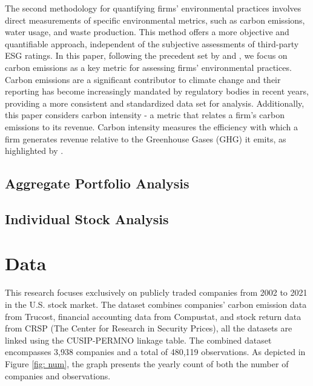 \documentclass[12pt]{article}
\begin{document}
The second methodology for quantifying firms' environmental practices involves direct measurements of specific environmental metrics, such as carbon emissions, water usage, and waste production. This method offers a more objective and quantifiable approach, independent of the subjective assessments of third-party ESG ratings. In this paper, following the precedent set by \cite{bolton2021investors} and \cite{ardia2022climate}, we focus on carbon emissions as a key metric for assessing firms' environmental practices. Carbon emissions are a significant contributor to climate change and their reporting has become increasingly mandated by regulatory bodies in recent years, providing a more consistent and standardized data set for analysis. Additionally, this paper considers carbon intensity - a metric that relates a firm's carbon emissions to its revenue. Carbon intensity measures the efficiency with which a firm generates revenue relative to the Greenhouse Gases (GHG) it emits, as highlighted by \cite{ilhan2021carbon}. 

\subsection{Aggregate Portfolio Analysis}

\subsection{Individual Stock Analysis}


\clearpage
\section{Data} \label{sec:data}
This research focuses exclusively on publicly traded companies from 2002 to 2021 in the U.S. stock market. The dataset combines companies' carbon emission data from Trucost, financial accounting data from Compustat, and stock return data from CRSP (The Center for Research in Security Prices), all the datasets are linked using the CUSIP-PERMNO linkage table. The combined dataset encompasses 3,938 companies and a total of 480,119 observations. As depicted in Figure \ref{fig: num}, the graph presents the yearly count of both the number of companies and observations.
\end{document}
